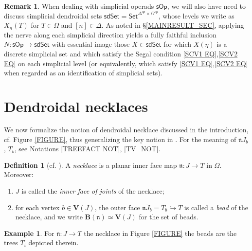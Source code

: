 \documentclass[a4paper,10pt]{article}%
\numberwithin{equation}{section}
\numberwithin{figure}{section}
\theoremstyle{definition} %
\newtheorem{definition}[equation]{Definition}%
\newtheorem{example}[equation]{Example}%
\newtheorem{remark}[equation]{Remark}%
\newcommand{\sOp}{\mathsf{sOp}}
\begin{document}
\begin{remark}\label{SIMPOPREM}
	When dealing with simplicial operads $\sOp$,
	we will also have need to discuss
	simplicial dendroidal sets
	$\mathsf{sdSet} = \mathsf{Set}^{\Delta^{op} \times \Omega^{op}}$,
	whose levels we write as
	$X_n(T)$ for $T \in \Omega$ and $[n] \in \Delta$.
	As noted in \S \ref{MAINRESULT_SEC},
	applying the nerve along each simplicial direction
	yields a fully faithful inclusion
	$N \colon \sOp \to \mathsf{sdSet}$
	with essential image those $X \in \mathsf{sdSet}$
	for which $X(\eta)$ is a discrete simplicial set
	and which satisfy the Segal condition 
	\eqref{SCV1 EQ},\eqref{SCV2 EQ}
	on each simplicial level
	(or equivalently, which satisfy
	\eqref{SCV1 EQ},\eqref{SCV2 EQ}
	when regarded as an identification of simplicial sets).
\end{remark}




\section{Dendroidal necklaces}





We now formalize the notion of dendroidal necklace
discussed in the introduction,
cf. Figure \ref{FIGURE}, 
thus generalizing the key notion in \cite{DS11}.
For the meaning of 
$\overline{\mathfrak{n}J_b}$, $T_b$, see
Notations \ref{TREEFACT NOT}, \ref{TV_NOT}.


\begin{definition}[{cf. \cite[\S 3]{DS11}}]
        \label{NECKLACE_DEF}
	A \emph{necklace} is 
	a planar inner face map
	$\mathfrak{n} \colon J \to T$
	in $\Omega$.
	Moreover:
	\begin{enumerate}[label = (\roman*)]
		\item 
		$J$ is called the \emph{inner face of joints} of the necklace;
		\item for each vertex $b \in \boldsymbol{V}(J)$,
		the outer face
		$\overline{\mathfrak{n} J_b} = T_b \hookrightarrow T$
		is called a \emph{bead} of the necklace,
		and we write
		$\boldsymbol{B}(\mathfrak{n}) 
		\simeq 
		\boldsymbol{V}(J)$
		for the set of beads.
	\end{enumerate}
\end{definition}

\begin{example}
	For $\mathfrak{n} \colon J \to T$ the necklace 
	in Figure \ref{FIGURE} the beads 
	are the trees $T_i$ depicted therein.
\end{example}
\end{document}
